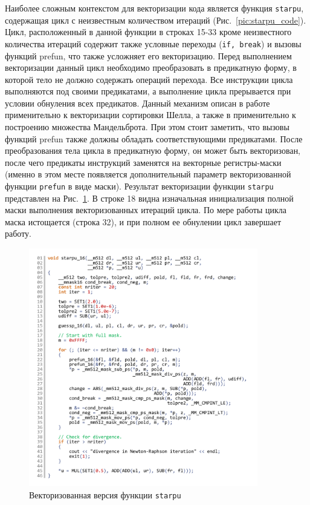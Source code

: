 \documentclass[utf8]{psta}
\begin{document}
Наиболее сложным контекстом для векторизации кода является функция \texttt{starpu}, содержащая цикл с неизвестным количеством итераций (Рис.~\ref{pic:starpu_code}).
Цикл, расположенный в данной функции в строках 15-33 кроме неизвестного количества итераций содержит также условные переходы (\texttt{if, break}) и вызовы функций prefun, что также усложняет его векторизацию.
Перед выполнением векторизации данный цикл необходимо преобразовать в предикатную форму, в которой тело не должно содержать операций перехода.
Все инструкции цикла выполняются под своими предикатами, а выполнение цикла прерывается при условии обнуления всех предикатов.
Данный механизм описан в работе \cite{RybTelShabLoopsVect} применительно к векторизации сортировки Шелла, а также в \cite{Krzikalla} применительно к построению множества Мандельброта.
При этом стоит заметить, что вызовы функций prefun также должны обладать соответствующими предикатами.
После преобразования тела цикла в предикатную форму, он может быть векторизован, после чего предикаты инструкций заменятся на векторные регистры-маски (именно в этом месте появляется дополнительный параметр векторизованной функции \texttt{prefun} в виде маски).
Результат векторизации функции \texttt{starpu} представлен на Рис.~\ref{pic:starpu_16_code}.
В строке 18 видна изначальная инициализация полной маски выполнения векторизованных итераций цикла. По мере работы цикла маска истощается (строка 32), и при полном ее обнулении цикл завершает работу.

\begin{figure}
\includegraphics[width=10cm]{pics/pic_starpu_16_code}
\caption{Векторизованная версия функции \texttt{starpu}}
\label{pic:starpu_16_code}
\end{figure}
\end{document}
